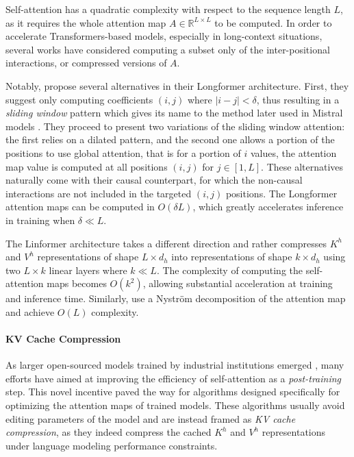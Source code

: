 Self-attention has a quadratic complexity with respect to the sequence length $L$, as it requires the whole attention map $A \in \mathbb{R}^{L \times L}$ to be computed. In order to accelerate Transformers-based models, especially in long-context situations, several works have considered computing a subset only of the inter-positional interactions, or compressed versions of $A$. 

Notably, \citet{beltagy2020longformer} propose several alternatives in their Longformer architecture. First, they suggest only computing coefficients $(i, j)$ where $|i - j| < \delta$, thus resulting in a \textit{sliding window} pattern which gives its name to the method later used in Mistral models \citep{jiang2023mistral}. They proceed to present two variations of the sliding window attention: the first relies on a dilated pattern, and the second one allows a portion of the positions to use global attention, that is for a portion of $i$ values, the attention map value is computed at all positions $(i, j)$ for $j \in [1, L]$. These alternatives naturally come with their causal counterpart, for which the non-causal interactions are not included in the targeted  $(i, j)$ positions. The Longformer attention maps can be computed in $O(\delta L)$, which greatly accelerates inference in training when $\delta \ll L$.

The Linformer architecture \citep{wang2020linformer} takes a different direction and rather compresses $K^h$ and $V^h$ representations of shape $L \times d_h$ into representations of shape $k \times d_h$ using two $L \times k$ linear layers where $k \ll L$. The complexity of computing the self-attention maps becomes $O(k^2)$, allowing substantial acceleration at training and inference time. Similarly, \citet{nystromformer} use a Nyström decomposition of the attention map and achieve $O(L)$ complexity.

\paragraph*{KV Cache Compression}

As larger open-sourced models trained by industrial institutions emerged \citep{jiang2023mistral,touvron2023llama}, many efforts have aimed at improving the efficiency of self-attention as a \textit{post-training} step. This novel incentive paved the way for algorithms designed specifically for optimizing the attention maps of trained models. These algorithms usually avoid editing parameters of the model and are instead framed as \textit{KV cache compression}, as they indeed compress the cached $K^h$ and $V^h$ representations under language modeling performance constraints.

